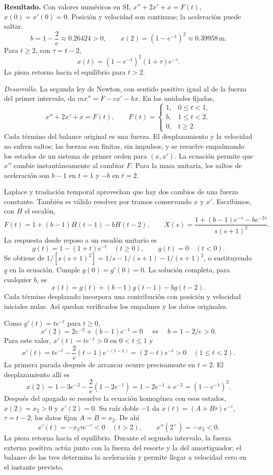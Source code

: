\noindent\textbf{Resultado.} Con valores numéricos en SI, \(x''+2x'+x=F(t)\), \(x(0)=x'(0)=0\). Posición y velocidad son continuas; la aceleración puede saltar.
\[
b=1-\frac2e\approx0.26424>0,\qquad
x(2)=(1-e^{-1})^2\approx0.39958\,\mathrm m.
\]
Para \(t\ge2\), con \(\tau=t-2\),
\[
x(t)=(1-e^{-1})^2(1+\tau)e^{-\tau}.
\]
La pieza retorna hacia el equilibrio para \(t>2\).

\noindent\textit{Desarrollo.} La segunda ley de Newton, con sentido positivo igual al de la fuerza del primer intervalo, da \(mx''=F-cx'-kx\). En las unidades fijadas,
\[
x''+2x'+x=F(t),\qquad
F(t)=\begin{cases}1,&0\le t<1,\\ b,&1\le t<2,\\0,&t\ge2.\end{cases}
\]
Cada término del balance original es una fuerza. El desplazamiento y la velocidad no sufren saltos: las fuerzas son finitas, sin impulsos, y se resuelve empalmando los estados de un sistema de primer orden para \((x,x')\). La ecuación permite que \(x''\) cambie instantáneamente al cambiar \(F\). Para la masa unitaria, los saltos de aceleración son \(b-1\) en \(t=1\) y \(-b\) en \(t=2\).

Laplace y traslación temporal aprovechan que hay dos cambios de una fuerza constante. También es válido resolver por tramos conservando \(x\) y \(x'\). Escribimos, con \(H\) el escalón,
\[
F(t)=1+(b-1)H(t-1)-bH(t-2),\qquad
X(s)=\frac{1+(b-1)e^{-s}-be^{-2s}}{s(s+1)^2}.
\]
La respuesta desde reposo a un escalón unitario es
\[
g(t)=1-(1+t)e^{-t}\quad(t\ge0),\qquad g(t)=0\quad(t<0).
\]
Se obtiene de \(1/[s(s+1)^2]=1/s-1/(s+1)-1/(s+1)^2\), o sustituyendo \(g\) en la ecuación. Cumple \(g(0)=g'(0)=0\). La solución completa, para cualquier \(b\), es
\[
x(t)=g(t)+(b-1)g(t-1)-bg(t-2).
\]
Cada término desplazado incorpora una contribución con posición y velocidad iniciales nulas. Así quedan verificados los empalmes y los datos originales.

Como \(g'(t)=te^{-t}\) para \(t\ge0\),
\[
x'(2)=2e^{-2}+(b-1)e^{-1}=0
\quad\Longleftrightarrow\quad b=1-2/e>0.
\]
Para este valor, \(x'(t)=te^{-t}>0\) en \(0<t\le1\) y
\[
x'(t)=te^{-t}-\frac2e(t-1)e^{-(t-1)}=(2-t)e^{-t}>0
\quad(1\le t<2).
\]
La primera parada después de arrancar ocurre precisamente en \(t=2\). El desplazamiento allí es
\[
x(2)=1-3e^{-2}-\frac2e(1-2e^{-1})=1-2e^{-1}+e^{-2}=(1-e^{-1})^2.
\]
Después del apagado se resuelve la ecuación homogénea con esos estados, \(x(2)=x_2>0\) y \(x'(2)=0\). Su raíz doble \(-1\) da \(x(t)=(A+B\tau)e^{-\tau}\), \(\tau=t-2\); los datos fijan \(A=B=x_2\). De ahí
\[
x'(t)=-x_2\tau e^{-\tau}<0\quad(t>2),\qquad x''(2^+)=-x_2<0.
\]
La pieza retorna hacia el equilibrio. Durante el segundo intervalo, la fuerza externa positiva actúa junto con la fuerza del resorte y la del amortiguador; el balance de las tres determina la aceleración y permite llegar a velocidad cero en el instante previsto.
